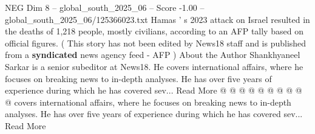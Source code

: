 \begin{textsample}{NEG Dim 8 – global\_south\_2025\_06 – Score -1.00 – global\_south\_2025\_06/125366023.txt}
Hamas ' s 2023 attack on Israel resulted in the deaths of 1,218 people, mostly civilians, according to an AFP tally based on official figures. ( This story has not been edited by News18 staff and is published from a \textbf{syndicated} news agency feed - AFP ) About the Author Shankhyaneel Sarkar is a senior subeditor at News18.
He covers international affairs, where he focuses on breaking news to in-depth analyses.
He has over five years of experience during which he has covered sev...
Read More @ @ @ @ @ @ @ @ @ @ covers international affairs, where he focuses on breaking news to in-depth analyses.
He has over five years of experience during which he has covered sev...
Read More

\end{textsample}
